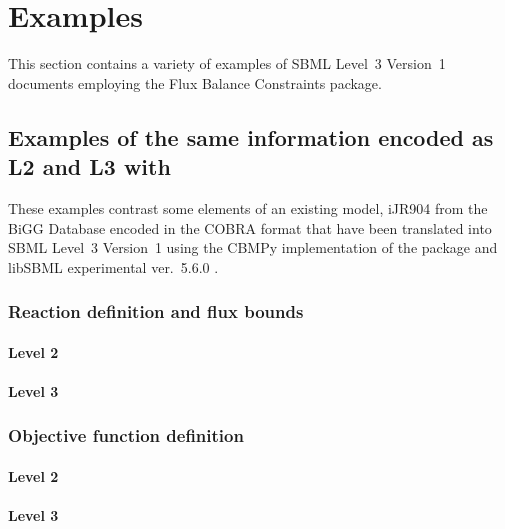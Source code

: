 
\section{Examples}
\label{examples}

This section contains a variety of examples of SBML Level~3 Version~1
documents employing the Flux Balance Constraints package. 

\subsection{Examples of the same information encoded as \SBML L2 and L3 with \FBC}
These examples contrast some elements of an existing model, iJR904 from the \textsf{BiGG} Database encoded in the \textsf{COBRA} format \cite{ijr904, bigg, cobra} that have been translated into SBML Level~3 Version~1 using the \textsf{CBMPy} implementation of the \FBC package \cite{pysces, cbmpy} and \textsf{libSBML} experimental ver.~5.6.0 \cite{libsbml}.


\subsubsection*{Reaction definition and flux bounds}
\paragraph{\SBML Level 2}
\newpage
\paragraph{\SBML Level 3}

\subsubsection*{Objective function definition}
\paragraph{\SBML Level 2}
\newpage
\paragraph{\SBML Level 3}
\protect{}

